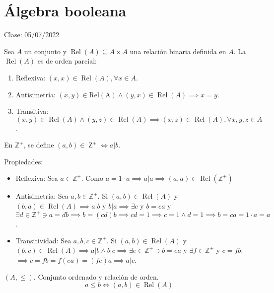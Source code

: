 
\section{Álgebra booleana}

Clase: 05/07/2022

\begin{definicion}
    Sea $A$ un conjunto y $\operatorname{Rel}(A)\subseteq A\times A$ una relación binaria definida en $A$. La $\operatorname{Rel}(A)$ es de orden parcial: 
    \begin{enumerate}
        \item Reflexiva: $(x,x)\in \operatorname{Rel}(A), \forall x\in A$. 
        \item Antisimetría: $(x,y)\in \operatorname{Rel(A)}\wedge(y,x)\in\operatorname{Rel}(A)\implies x=y$.
        \item Transitiva: $(x,y)\in \operatorname{Rel}(A)\wedge (y,z)\in \operatorname{Rel}(A)\implies (x,z)\in\operatorname{Rel}(A),\forall x,y,z\in A$. 
    \end{enumerate}
\end{definicion}

\begin{ejemplo}
    En $\mathbb{Z}^+$, se define $(a,b)\in \operatorname{Z}^
    + \iff a|b$.
    \begin{sol}
        Propiedades: 
        \begin{itemize}
            \item Reflexiva: Sea $a\in\mathbb{Z}^+$. Como $a=1\cdot a\implies a|a\implies (a,a)\in \operatorname{Rel}(\mathbb{Z}^+)$
            \item Antisimetría: Sea $a,b\in\mathbb{Z}^+$. Si $(a,b)\in\operatorname{Rel}(A)$ y $(b,a)\in \operatorname{Rel}(A)\implies a|b$ y $b|a\implies \exists c$ y $b=ca$ y $\exists d\in \mathbb{Z}^+\ni a=db\implies b=(cd)b\implies cd=1\implies c=1\wedge d=1\implies b=ca=1\cdot a=a$.
            \item Transitividad: Sea $a,b,c\in\mathbb{Z}^+$. Si $(a,b)\in\operatorname{Rel}(A)$ y $(b,c)\in \operatorname{Rel}(A)\implies a|b\wedge b|c\implies \exists e\in\mathbb{Z}^+\ni b=ea$ y $\exists f\in \mathbb{Z}^+$ y $c=fb$. $\implies c=fb=f(ea)=(fe)a\implies a|c$. 
        \end{itemize}
    \end{sol}
\end{ejemplo}



\begin{nota}
    $(A,\leq)$. Conjunto ordenado y relación de orden.
    $$a\leq b\iff (a,b)\in \operatorname{Rel}(A)$$
\end{nota}

